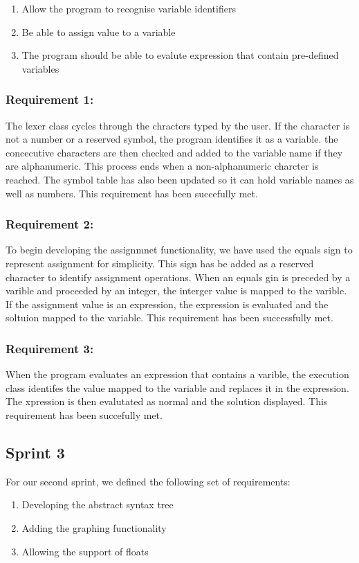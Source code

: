 \documentclass[a4paper, oneside, 11pt]{report}
\begin{document}
\begin{enumerate}
\item Allow the program to recognise variable identifiers
\item Be able to assign value to a variable
\item The program should be able to evalute expression that contain pre-defined variables
\end{enumerate}

\subsubsection{Requirement 1: }

The lexer class cycles through the chracters typed by the user. If the character is not a number or a reserved symbol, the program identifies it as a variable. the concecutive characters are then checked and added to the variable name if they are alphanumeric. This process ends when a non-alphanumeric charcter is reached.
The symbol table has also been updated so it can hold variable names as well as numbers.
This requirement has been succefully met.

\subsubsection{Requirement 2: }

To begin developing the assignmnet functionality, we have used the equals sign to represent assignment for simplicity. This sign has be added as a reserved character to identify assignment operations. When an equals gin is preceded by a varible and proceeded by an integer, the interger value is mapped to the varible. If the assignment value is an expression, the expression is evaluated and the soltuion mapped to the variable.
This requirement has been successfully met.

\subsubsection{Requirement 3: }

When the program evaluates an expression that contains a varible, the execution class identifes the value mapped to the variable and replaces it in the expression. The xpression is then evalutated as normal and the solution displayed.
This requirement has been succefully met.

\subsection{Sprint 3}
For our second sprint, we defined the following set of requirements:
\begin{enumerate}
\item Developing the abstract syntax tree
\item Adding the graphing functionality
\item Allowing the support of floats
\end{enumerate}
\end{document}
